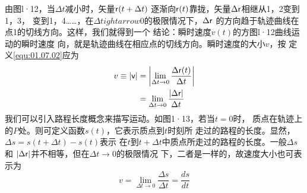 由图l·12，当$\Delta t$减小时，矢量${\sf r}(t+\Delta t)$
逐渐向${\sf r}(t)$靠拢，矢量$\Delta {\sf r}$相继从1，2变到1，3，
变到1，4……，在$\Delta t ightarrow 0$的极限情况下，$\Delta {\sf r}$
的方向趋于轨迹曲线在点1的切线方向。这样，我们就得到一个
结论：瞬时速度$v(t)$的方图l·12曲线运动的瞬时速度
向，就是轨迹曲线在相应点的切线方向。瞬时速度的大小$v$，按
定义\eqref{equ:01.07.02}应为
\begin{equation*}
    \begin{aligned}
        v\equiv |{\sf v}| &=\left|\lim _{\Delta t \rightarrow 0} \frac{\Delta {\sf r}(t)}{\Delta t}\right| \\
        &=\lim _{\Delta t \rightarrow 0} \frac{|\Delta {\sf r}|}{\Delta t}
    \end{aligned}
\end{equation*}
我们可以引入路程长度概念来描写运动。如图1·13，若当$t=0$时，
质点在轨迹上的$P$处。则可定义函数$s(t)$，它表示质点到$t$时刻所
走过的路程的长度。显然，$\Delta s=s(t+\Delta t)-s(t)$表示
在$t$到$t+\Delta t$中质点所走过的路程的长度。一般$\Delta s$和
$|\Delta {\sf r}|$并不相等，但在$\Delta t \rightarrow 0$的极限情况
下，二者是一样的，故速度大小也可表示为
\begin{equation}\label{equ:01.07.05}
    v=\lim_{\Delta t \rightarrow 0}\frac{\Delta s}{\Delta t}=\frac{ds}{dt}
\end{equation}

